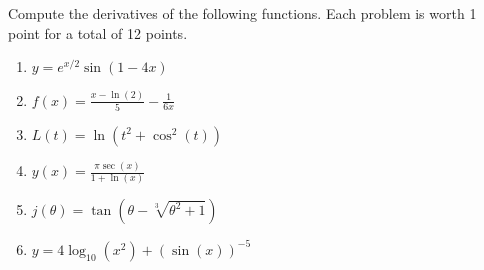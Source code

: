 \documentclass[12pt]{article}
\newcommand{\ds}{\displaystyle}
\begin{document}
Compute the derivatives of the following functions. Each problem is worth 1 point for a total of 12 points.
\begin{enumerate}


\item $\ds y=e^{x/2}\sin(1-4x)$


\vfill

\item $\ds f(x)= \frac{x-\ln(2)}{5}-\frac{1}{6x} $\\


\vfill

\item   $\ds L(t)=\ln(t^2+\cos^2(t))$\\


\vfill
\newpage


\item   $\ds y(x)=\frac{\pi \sec(x)}{1+\ln(x)} $\\

\vfill

\item   $\ds j(\theta) = \tan(\theta-\sqrt[3]{\theta^2+1})$\\


\vfill

\item  $\ds y=4 \log_{10} (x^2) + (\sin(x))^{-5}$



\end{enumerate}
\end{document}
